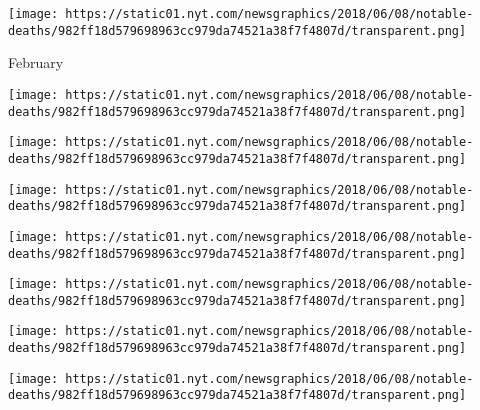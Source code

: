 \href{https://www.nytimes.com/2018/03/04/obituaries/roger-bannister-dead.html}{}

\texttt{[image: https://static01.nyt.com/newsgraphics/2018/06/08/notable-deaths/982ff18d579698963cc979da74521a38f7f4807d/transparent.png]}

February

\href{https://www.nytimes.com/2018/02/27/obituaries/cynthia-heimel-irreverent-writer-about-sex-dies-at-70.html}{}

\texttt{[image: https://static01.nyt.com/newsgraphics/2018/06/08/notable-deaths/982ff18d579698963cc979da74521a38f7f4807d/transparent.png]}

\href{https://www.nytimes.com/2018/02/23/obituaries/nanette-fabray-star-of-tv-and-stage-comedies-dies-at-97.html}{}

\texttt{[image: https://static01.nyt.com/newsgraphics/2018/06/08/notable-deaths/982ff18d579698963cc979da74521a38f7f4807d/transparent.png]}

\href{https://www.nytimes.com/2018/02/21/obituaries/billy-graham-dead.html}{}

\texttt{[image: https://static01.nyt.com/newsgraphics/2018/06/08/notable-deaths/982ff18d579698963cc979da74521a38f7f4807d/transparent.png]}

\href{https://www.nytimes.com/2018/02/19/obituaries/gunter-blobel-nobel-laureate-who-found-cell-zip-codes-dies-at-81.html}{}

\texttt{[image: https://static01.nyt.com/newsgraphics/2018/06/08/notable-deaths/982ff18d579698963cc979da74521a38f7f4807d/transparent.png]}

\href{https://www.nytimes.com/2018/02/16/obituaries/jim-bridwell-mountaineering-maverick-is-dead-at-73.html}{}

\texttt{[image: https://static01.nyt.com/newsgraphics/2018/06/08/notable-deaths/982ff18d579698963cc979da74521a38f7f4807d/transparent.png]}

\href{https://www.nytimes.com/2018/02/14/obituaries/ruth-ann-koesun-versatile-ballet-theater-dancer-dies-at-89.html}{}

\texttt{[image: https://static01.nyt.com/newsgraphics/2018/06/08/notable-deaths/982ff18d579698963cc979da74521a38f7f4807d/transparent.png]}

\href{https://www.nytimes.com/2018/02/13/obituaries/marty-allen-wild-eyed-comedy-star-is-dead-at-95.html}{}

\texttt{[image: https://static01.nyt.com/newsgraphics/2018/06/08/notable-deaths/982ff18d579698963cc979da74521a38f7f4807d/transparent.png]}

